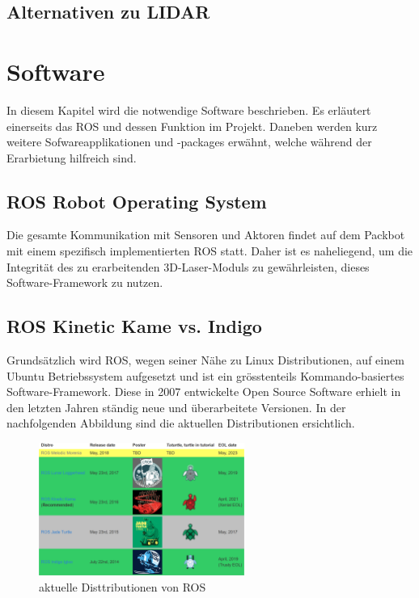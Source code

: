 \subsection{Alternativen zu LIDAR}
 \label{subsec:Alternative}
 
 

\section{Software}
\label{sec:Software}
In diesem Kapitel wird die notwendige Software beschrieben. Es erläutert einerseits das ROS und dessen Funktion im Projekt. Daneben werden kurz weitere Sofwareapplikationen und -packages erwähnt, welche während der Erarbietung hilfreich sind.

\subsection{ROS Robot Operating System}
\label{subsec:ROS}
Die gesamte Kommunikation mit Sensoren und Aktoren findet auf dem Packbot mit einem spezifisch implementierten \ac{ROS} statt. Daher ist es naheliegend, um die Integrität des zu erarbeitenden 3D-Laser-Moduls zu gewährleisten, dieses Software-Framework zu nutzen.  

\subsection{ROS Kinetic Kame vs. Indigo}
\label{subsec:OS_versus} 
Grundsätzlich wird ROS, wegen seiner Nähe zu Linux Distributionen, auf einem Ubuntu Betriebssystem aufgesetzt und ist ein grösstenteils Kommando-basiertes Software-Framework. Diese in 2007 entwickelte Open Source Software erhielt in den letzten Jahren ständig neue und überarbeitete Versionen. In der nachfolgenden Abbildung sind die aktuellen Distributionen ersichtlich.

\begin{figure}[H]
	\centering
	\includegraphics[width=0.6\textwidth]{resources/rosdistos.PNG}
	\caption[aktuelle Disttributionen von ROS]{aktuelle Disttributionen von ROS {\cite{ROSprojects}}}
	\label{fig:rosdistros}
\end{figure} 

